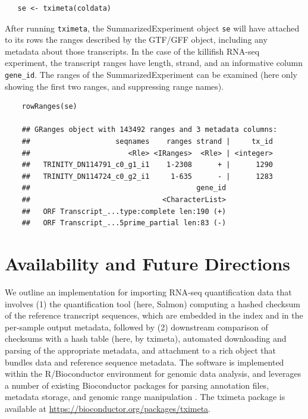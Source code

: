 \begin{verbatim}
   se <- tximeta(coldata)
\end{verbatim}

After running \texttt{tximeta}, the SummarizedExperiment object
\texttt{se} will have attached to its rows the ranges described by the
GTF/GFF object, including any metadata about those transcripts. In the
case of the killifish RNA-seq experiment, the transcript ranges have
length, strand, and an informative column \texttt{gene\_id}. The ranges
of the SummarizedExperiment can be examined (here only showing the first
two ranges, and suppressing range names).

\begin{verbatim}
    rowRanges(se)

    ## GRanges object with 143492 ranges and 3 metadata columns:
    ##                    seqnames    ranges strand |     tx_id
    ##                       <Rle> <IRanges>  <Rle> | <integer>
    ##   TRINITY_DN114791_c0_g1_i1    1-2308      + |      1290
    ##   TRINITY_DN114724_c0_g2_i1     1-635      - |      1283
    ##                                       gene_id
    ##                               <CharacterList>
    ##   ORF Transcript_...type:complete len:190 (+)
    ##   ORF Transcript_...5prime_partial len:83 (-)
\end{verbatim}

\section*{Availability and Future Directions}

We outline an implementation for importing RNA-seq quantification
data that involves (1) the quantification tool (here, Salmon)
computing a hashed checksum of the reference transcript sequences,
which are embedded in the index and in the per-sample output metadata,
followed by (2) downstream comparison of checksums with a hash table
(here, by tximeta), automated downloading and parsing of the
appropriate metadata, and attachment to a rich object that bundles
data and reference sequence metadata. The software is implemented
within the R/Bioconductor environment for genomic data analysis, and leverages
a number of existing Bioconductor packages for parsing annotation
files, metadata storage, and genomic range manipulation
\cite{bioc,ensembldb,biocfilecache,granges}. The tximeta package is
available at \url{https://bioconductor.org/packages/tximeta}.

